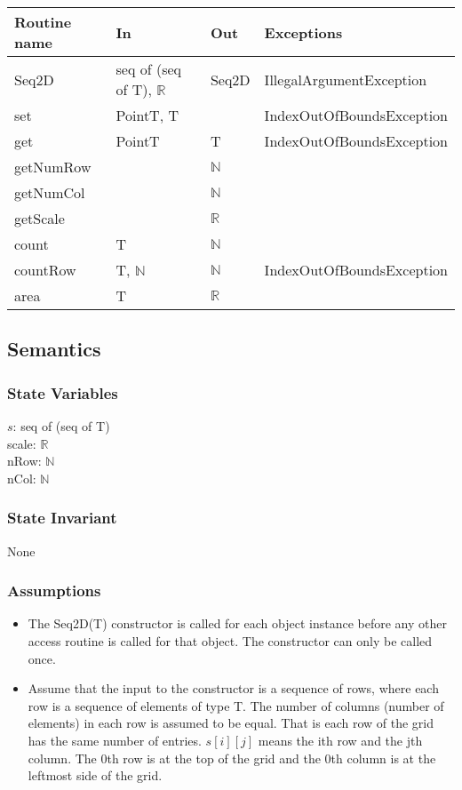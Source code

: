 \documentclass[12pt]{article}
\begin{document}
\begin{tabular}{| l | l | l | p{6cm} |}
\hline
\textbf{Routine name} & \textbf{In} & \textbf{Out} & \textbf{Exceptions}\\
\hline
Seq2D & seq of (seq of T), $\mathbb{R}$ & Seq2D & IllegalArgumentException\\
\hline
set & PointT, T & ~ & IndexOutOfBoundsException\\
\hline
get & PointT & T & IndexOutOfBoundsException\\
\hline
getNumRow & ~ & $\mathbb{N}$ & \\
\hline
getNumCol & ~ & $\mathbb{N}$ & \\
\hline
getScale & ~ & $\mathbb{R}$ & \\
\hline
count & T & $\mathbb{N}$ & \\
\hline
countRow & T, $\mathbb{N}$ & $\mathbb{N}$ & IndexOutOfBoundsException\\
\hline
area & T & $\mathbb{R}$ & \\
\hline
\end{tabular}

\subsection* {Semantics}

\subsubsection* {State Variables}

$s$: seq of (seq of T)\\
scale: $\mathbb{R}$\\
nRow: $\mathbb{N}$\\
nCol: $\mathbb{N}$

\subsubsection* {State Invariant}

None

\subsubsection* {Assumptions}

\begin{itemize}
\item The Seq2D(T) constructor is called for each object instance before any
other access routine is called for that object.  The constructor can only be
called once.
\item Assume that the input to the constructor is a sequence of rows, where each
  row is a sequence of elements of type T.  The number of columns (number of
  elements) in each row is assumed to be equal. That is each row
  of the grid has the same number of entries.  $s[i][j]$ means the ith row and
  the jth column.  The 0th row is at the top of the grid and the 0th column
  is at the leftmost side of the grid.
\end{itemize}
\end{document}
